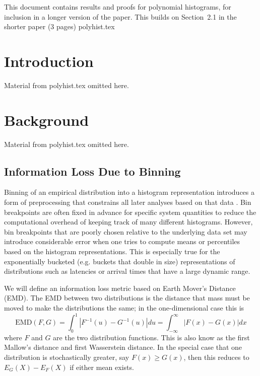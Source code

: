 \documentclass{article}
\begin{document}
This document contains results and proofs for polynomial histograms,
for inclusion in a longer version of the paper.
This builds on Section~2.1 in the shorter paper (3 pages) polyhist.tex

\section{Introduction}

Material from polyhist.tex omitted here.

\section{Background}

Material from polyhist.tex omitted here.


\subsection{Information Loss Due to Binning}

Binning of an empirical
distribution into a histogram representation introduces a form of
preprocessing that constrains all later analyses based on that data
\cite{blocker2013potential}.  Bin breakpoints are often fixed in
advance for specific system quantities to reduce the computational
overhead of keeping track of many different histograms.
However, bin breakpoints that are
poorly chosen relative to the underlying data set may introduce
considerable error when one tries to compute means or percentiles
based on the histogram representations.  This is especially true for
the exponentially bucketed (e.g. buckets that double in size)
representations of distributions such as
latencies or arrival times that have a large dynamic range.

We will define an information loss metric based on
Earth Mover's Distance (EMD).
The EMD between
two distributions is the distance that mass must be moved to make
the distributions the same; in the one-dimensional case this is
\begin{equation}
  \mbox{EMD}(F,G)
  = \int_0^1 |F^{-1}(u) - G^{-1}(u)| du
  = \int_{-\infty}^\infty |F(x) - G(x)| dx
\end{equation}
where $F$ and $G$ are the two distribution functions.
This is also know as the first Mallow's
distance and first Wasserstein distance.
In the special case that one distribution is stochastically greater,
say $F(x) \ge G(x)$, then this reduces to $E_G(X) - E_F(X)$ if either
mean exists.
\end{document}
